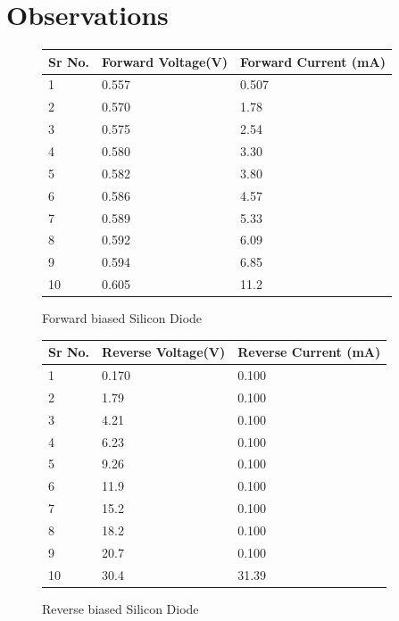 	\section{Observations}
		\begin{figure}[h!]
			\begin{longtable}[]{@{}lll@{}}
				\toprule
				Sr No. & Forward Voltage(V) & Forward Current (mA)\tabularnewline
				\midrule
				\endhead
					1 & 0.557 & 0.507\tabularnewline
					2 & 0.570 & 1.78\tabularnewline
					3 & 0.575 & 2.54\tabularnewline
					4 & 0.580 & 3.30\tabularnewline
					5 & 0.582 & 3.80\tabularnewline
					6 & 0.586 & 4.57\tabularnewline
					7 & 0.589 & 5.33\tabularnewline
					8 & 0.592 & 6.09\tabularnewline
					9 & 0.594 & 6.85\tabularnewline
					10 & 0.605 & 11.2\tabularnewline
				\bottomrule
			\end{longtable}
			\caption{Forward biased Silicon Diode}
		\end{figure}
		\begin{figure}[h!]
			\begin{longtable}[]{@{}lll@{}}
				\toprule
				Sr No. & Reverse Voltage(V) & Reverse Current (mA)\tabularnewline
				\midrule
				\endhead
				1 & 0.170 & 0.100\tabularnewline
				2 & 1.79 & 0.100\tabularnewline
				3 & 4.21 & 0.100\tabularnewline
				4 & 6.23 & 0.100\tabularnewline
				5 & 9.26 & 0.100\tabularnewline
				6 & 11.9 & 0.100\tabularnewline
				7 & 15.2 & 0.100\tabularnewline
				8 & 18.2 & 0.100\tabularnewline
				9 & 20.7 & 0.100\tabularnewline
				10 & 30.4 & 31.39\tabularnewline
				\bottomrule
			\end{longtable}
			\caption{Reverse biased Silicon Diode}
		\end{figure}
	
	
	
